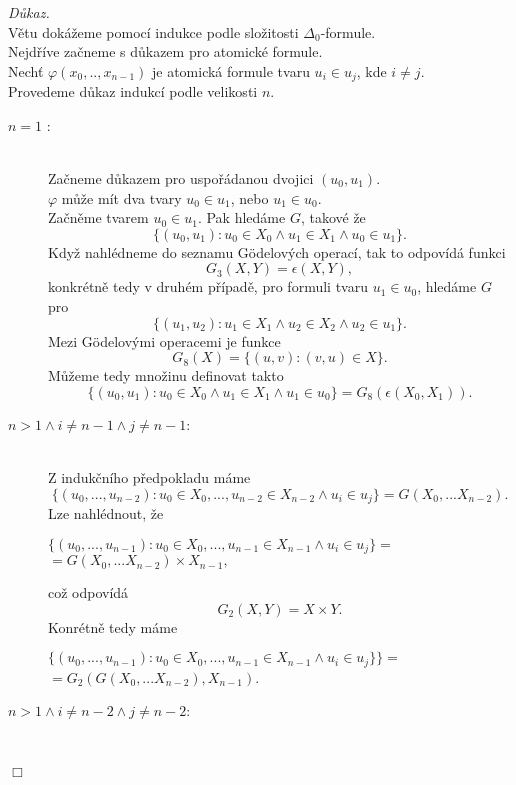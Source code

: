 \documentclass[12pt,a4paper]{article}
\newenvironment{proof}
{\noindent \textit{D\r{u}kaz.}}
{\hspace*{\fill} $\Box$}
\begin{document}
\begin{proof}
~\\
V\v{e}tu dok\'{a}\v{z}eme pomoc\'{i} indukce podle slo\v{z}itosti $\Delta_0$-formule. \\
Nejd\v{r}\'{i}ve za\v{c}neme s d\r{u}kazem pro atomick\'{e} formule.\\
Nech\v{t} $\varphi(x_0,..,x_{n-1})$ je atomick\'{a} formule tvaru $u_i \in u_j$, kde $i \neq j$.\\
Provedeme d\r{u}kaz indukc\'{i} podle velikosti $ n $.
\begin{description}
\item[ $ n=1 $ :] ~\\
Za\v{c}neme d\r{u}kazem pro uspo\v{r}\'{a}danou dvojici $ (u_0 , u_1) $.\\
$\varphi$ m\r{u}\v{z}e m\'{i}t dva tvary  $ u_0 \in  u_1 $, nebo  $ u_1 \in  u_0 $.\\ 
Za\v{c}n\v{e}me tvarem  $ u_0 \in  u_1 $. Pak hled\'{a}me $ G $, takov\'{e} \v{z}e
\[  \{(u_0 , u_1) : u_0 \in  X_0 \wedge  u_1 \in  X_1 \wedge  u_0 \in  u_1 \}   .\]
Kdy\v{z} nahl\'{e}dneme do seznamu G\"{o}delov\'{y}ch operac\'{i}, tak to odpov\'{i}d\'{a} funkci  
\[ G_3(X,Y)=\epsilon(X,Y), \] 
konkr\'{e}tn\v{e} tedy v druh\'{e}m p\v{r}\'{i}pad\v{e}, pro formuli tvaru $ u_1 \in  u_0 $, hled\'{a}me $ G $ pro 
\[  \{(u_1 , u_2) : u_1 \in  X_1 \wedge  u_2 \in  X_2 \wedge  u_2 \in  u_1 \} .\]  
Mezi G\"{o}delov\'{y}mi operacemi je funkce 
\[  G_8(X)= \{(u,v): (v,u) \in X \}  .\]
M\r{u}\v{z}eme tedy mno\v{z}inu definovat takto 
\[ \{(u_0 , u_1) : u_0 \in  X_0 \wedge  u_1 \in  X_1 \wedge  u_1 \in  u_0 \}=G_8(\epsilon(X_0,X_1)) .\]
 \item[$ n > 1 \wedge  i\neq  n-1 \wedge j \neq  n-1 $:]~\\
Z induk\v{c}n\'{i}ho p\v{r}edpokladu m\'{a}me
\[ \{(u_0 ,..., u_{n-2} ): u_0 \in  X_0,..., u_{n-2}  \in  X_{n-2}  \wedge  u_i \in  u_j \}=G(X_0,...X_{n-2})  . \]
Lze  nahl\'{e}dnout, \v{z}e \begin{center}
$\{(u_0 ,..., u_{n-1}) : u_0 \in  X_0,...,u_{n-1}  \in  X_{n-1}  \wedge  u_i \in  u_j \}=$ $=G(X_0,...X_{n-2}) \times X_{n-1},$
\end{center}
co\v{z} odpov\'{i}d\'{a}
\[ G_2(X,Y)= X \times  Y .\]
Konr\'{e}tn\v{e} tedy m\'{a}me
\begin{center}
$ \{(u_0 ,..., u_{n-1}) : u_0 \in  X_0,..., u_{n-1}  \in  X_{n-1}  \wedge  u_i \in  u_j \}\}=$ $=G_2(G(X_0,...X_{n-2}),X_{n-1}) $.
\end{center}
 \item[$ n > 1 \wedge  i\neq  n-2 \wedge j \neq  n-2 $:]~\\

\end{description}
\end{proof}
\end{document}
